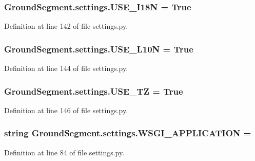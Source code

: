 \subsubsection[{U\+S\+E\+\_\+\+I18\+N}]{\setlength{\rightskip}{0pt plus 5cm}Ground\+Segment.\+settings.\+U\+S\+E\+\_\+\+I18\+N = True}\label{namespace_ground_segment_1_1settings_a58a4a6948688cc8ccf2f31d6bea3a954}


Definition at line 142 of file settings.\+py.

\hypertarget{namespace_ground_segment_1_1settings_a8cf0ce46819ba284c86a1e87267378af}{}
\subsubsection[{U\+S\+E\+\_\+\+L10\+N}]{\setlength{\rightskip}{0pt plus 5cm}Ground\+Segment.\+settings.\+U\+S\+E\+\_\+\+L10\+N = True}\label{namespace_ground_segment_1_1settings_a8cf0ce46819ba284c86a1e87267378af}


Definition at line 144 of file settings.\+py.

\hypertarget{namespace_ground_segment_1_1settings_a1d9e63721f37542ce41c8145755c7d7e}{}
\subsubsection[{U\+S\+E\+\_\+\+T\+Z}]{\setlength{\rightskip}{0pt plus 5cm}Ground\+Segment.\+settings.\+U\+S\+E\+\_\+\+T\+Z = True}\label{namespace_ground_segment_1_1settings_a1d9e63721f37542ce41c8145755c7d7e}


Definition at line 146 of file settings.\+py.

\hypertarget{namespace_ground_segment_1_1settings_a5ae8b98baa409aa4ea87856e4114a64e}{}
\subsubsection[{W\+S\+G\+I\+\_\+\+A\+P\+P\+L\+I\+C\+A\+T\+I\+O\+N}]{\setlength{\rightskip}{0pt plus 5cm}string Ground\+Segment.\+settings.\+W\+S\+G\+I\+\_\+\+A\+P\+P\+L\+I\+C\+A\+T\+I\+O\+N = \textquotesingle{}}\label{namespace_ground_segment_1_1settings_a5ae8b98baa409aa4ea87856e4114a64e}


Definition at line 84 of file settings.\+py.

